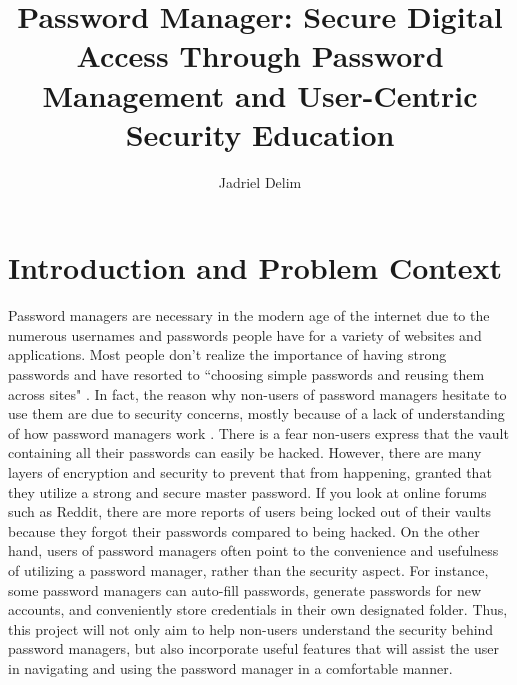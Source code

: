 \documentclass[10pt,twocolumn]{article}
\title{Password Manager: Secure Digital Access Through Password Management and User-Centric Security Education}
\author{Jadriel Delim}
\affiliation{Occidental College}
\begin{document}
\maketitle


\section{Introduction and Problem Context}
Password managers are necessary in the modern age of the internet due to the numerous usernames and passwords people have for a variety of websites and applications. Most people don't realize the importance of having strong passwords and have resorted to ``choosing simple passwords and reusing them across sites" \cite{li2014emperor}. In fact, the reason why non-users of password managers hesitate to use them are due to security concerns, mostly because of a lack of understanding of how password managers work \cite{fagan_albayram_khan_buck_2017}. There is a fear non-users express that the vault containing all their passwords can easily be hacked. However, there are many layers of encryption and security to prevent that from happening, granted that they utilize a strong and secure master password. If you look at online forums such as Reddit, there are more reports of users being locked out of their vaults because they forgot their passwords compared to being hacked. On the other hand, users of password managers often point to the convenience and usefulness of utilizing a password manager, rather than the security aspect\cite{fagan_albayram_khan_buck_2017}. For instance, some password managers can auto-fill passwords, generate passwords for new accounts, and conveniently store credentials in their own designated folder. Thus, this project will not only aim to help non-users understand the security behind password managers, but also incorporate useful features that will assist the user in navigating and using the password manager in a comfortable manner.
\end{document}
